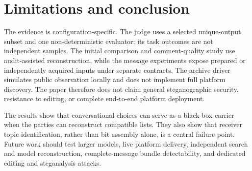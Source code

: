 \documentclass[3p,times,procedia]{elsarticle}
\begin{document}
\section{Limitations and conclusion}

The evidence is configuration-specific. The judge uses a selected unique-output subset and one non-deterministic evaluator; its task outcomes are not independent samples. The initial comparison and comment-quality study use audit-assisted reconstruction, while the message experiments expose prepared or independently acquired inputs under separate contracts. The archive driver simulates public observation locally and does not implement full platform discovery. The paper therefore does not claim general steganographic security, resistance to editing, or complete end-to-end platform deployment.

The results show that conversational choices can serve as a black-box carrier when the parties can reconstruct compatible lists. They also show that receiver topic identification, rather than bit assembly alone, is a central failure point. Future work should test larger models, live platform delivery, independent search and model reconstruction, complete-message bundle detectability, and dedicated editing and steganalysis attacks.



\end{document}
